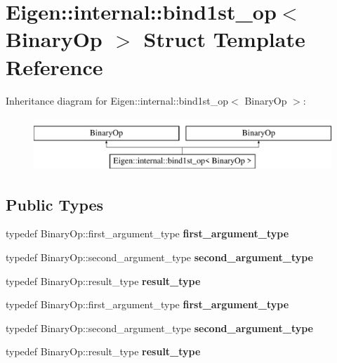 \hypertarget{struct_eigen_1_1internal_1_1bind1st__op}{}\section{Eigen\+:\+:internal\+:\+:bind1st\+\_\+op$<$ Binary\+Op $>$ Struct Template Reference}
\label{struct_eigen_1_1internal_1_1bind1st__op}
Inheritance diagram for Eigen\+:\+:internal\+:\+:bind1st\+\_\+op$<$ Binary\+Op $>$\+:\begin{figure}[H]
\begin{center}
\leavevmode
\includegraphics[height=2.000000cm]{struct_eigen_1_1internal_1_1bind1st__op}
\end{center}
\end{figure}
\subsection*{Public Types}
\begin{DoxyCompactItemize}
\item 
\mbox{\label{struct_eigen_1_1internal_1_1bind1st__op_a7077959adccaa8d1b40651aa62e52b57}} 
typedef Binary\+Op\+::first\+\_\+argument\+\_\+type {\bfseries first\+\_\+argument\+\_\+type}
\item 
\mbox{\label{struct_eigen_1_1internal_1_1bind1st__op_a02181cf233191b49866496b14645b041}} 
typedef Binary\+Op\+::second\+\_\+argument\+\_\+type {\bfseries second\+\_\+argument\+\_\+type}
\item 
\mbox{\label{struct_eigen_1_1internal_1_1bind1st__op_ac869c115c8c893e8d26b701e737de71d}} 
typedef Binary\+Op\+::result\+\_\+type {\bfseries result\+\_\+type}
\item 
\mbox{\label{struct_eigen_1_1internal_1_1bind1st__op_a7077959adccaa8d1b40651aa62e52b57}} 
typedef Binary\+Op\+::first\+\_\+argument\+\_\+type {\bfseries first\+\_\+argument\+\_\+type}
\item 
\mbox{\label{struct_eigen_1_1internal_1_1bind1st__op_a02181cf233191b49866496b14645b041}} 
typedef Binary\+Op\+::second\+\_\+argument\+\_\+type {\bfseries second\+\_\+argument\+\_\+type}
\item 
\mbox{\label{struct_eigen_1_1internal_1_1bind1st__op_ac869c115c8c893e8d26b701e737de71d}} 
typedef Binary\+Op\+::result\+\_\+type {\bfseries result\+\_\+type}
\end{DoxyCompactItemize}
